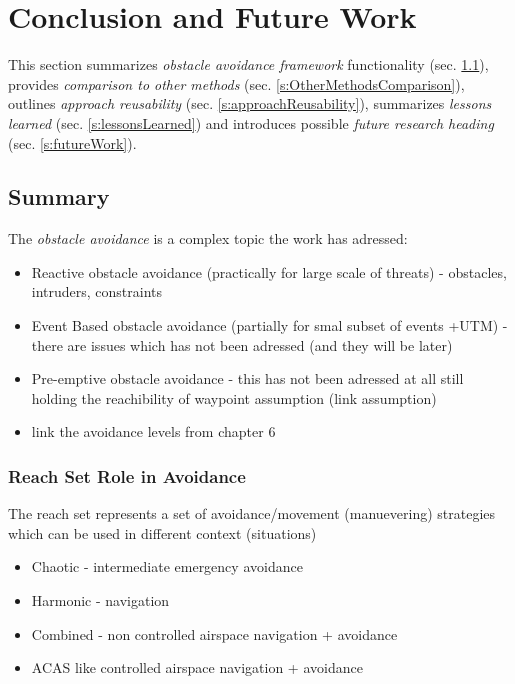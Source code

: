 \setcounter{chapter}{7}
\setcounter{section}{0}
\setcounter{subsection}{0}

\cleardoublepage
\chapter{Conclusion and Future Work}\label{ch:Conclusion}
\noindent This section summarizes \emph{obstacle avoidance framework} functionality (sec. \ref{s:conclusionSummary}), provides \emph{comparison to other methods} (sec. \ref{s:OtherMethodsComparison}), outlines \emph{approach reusability} (sec. \ref{s:approachReusability}), summarizes \emph{lessons learned} (sec. \ref{s:lessonsLearned}) and introduces possible \emph{future research heading} (sec. \ref{s:futureWork}).

\section{Summary}\label{s:conclusionSummary}
\noindent The \emph{obstacle avoidance} is a complex topic the work has adressed:
\begin{itemize}
    \item Reactive obstacle avoidance (practically for large scale of threats) - obstacles, intruders, constraints
    
    \item Event Based obstacle avoidance (partially for smal subset of events +UTM) - there are issues which has not been adressed (and they will be later)
    
    \item Pre-emptive obstacle avoidance - this has not been adressed at all still holding the reachibility of waypoint assumption (link assumption) 
    \item link the avoidance levels from chapter 6
\end{itemize}

    
\subsection{Reach Set Role in Avoidance}\label{s:conclusionReachSet}

\noindent The reach set represents a set of avoidance/movement (manuevering) strategies which can be used in different context (situations)
\begin{itemize}
    \item Chaotic - intermediate emergency avoidance
    \item Harmonic - navigation
    \item Combined - non controlled airspace navigation + avoidance
    \item ACAS like  controlled airspace navigation + avoidance
\end{itemize}


